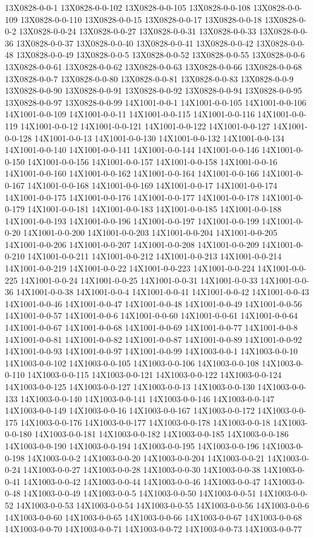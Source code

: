 \documentclass[
]{book}
\begin{document}
13X0828-0-0-1 13X0828-0-0-102 13X0828-0-0-105 13X0828-0-0-108 13X0828-0-0-109 13X0828-0-0-110 13X0828-0-0-15 13X0828-0-0-17 13X0828-0-0-18 13X0828-0-0-2 13X0828-0-0-24 13X0828-0-0-27 13X0828-0-0-31 13X0828-0-0-33 13X0828-0-0-36 13X0828-0-0-37 13X0828-0-0-40 13X0828-0-0-41 13X0828-0-0-42 13X0828-0-0-48 13X0828-0-0-49 13X0828-0-0-5 13X0828-0-0-52 13X0828-0-0-55 13X0828-0-0-6 13X0828-0-0-61 13X0828-0-0-62 13X0828-0-0-63 13X0828-0-0-66 13X0828-0-0-68 13X0828-0-0-7 13X0828-0-0-80 13X0828-0-0-81 13X0828-0-0-83 13X0828-0-0-9 13X0828-0-0-90 13X0828-0-0-91 13X0828-0-0-92 13X0828-0-0-94 13X0828-0-0-95 13X0828-0-0-97 13X0828-0-0-99 14X1001-0-0-1 14X1001-0-0-105 14X1001-0-0-106 14X1001-0-0-109 14X1001-0-0-11 14X1001-0-0-115 14X1001-0-0-116 14X1001-0-0-119 14X1001-0-0-12 14X1001-0-0-121 14X1001-0-0-122 14X1001-0-0-127 14X1001-0-0-128 14X1001-0-0-13 14X1001-0-0-130 14X1001-0-0-132 14X1001-0-0-134 14X1001-0-0-140 14X1001-0-0-141 14X1001-0-0-144 14X1001-0-0-146 14X1001-0-0-150 14X1001-0-0-156 14X1001-0-0-157 14X1001-0-0-158 14X1001-0-0-16 14X1001-0-0-160 14X1001-0-0-162 14X1001-0-0-164 14X1001-0-0-166 14X1001-0-0-167 14X1001-0-0-168 14X1001-0-0-169 14X1001-0-0-17 14X1001-0-0-174 14X1001-0-0-175 14X1001-0-0-176 14X1001-0-0-177 14X1001-0-0-178 14X1001-0-0-179 14X1001-0-0-181 14X1001-0-0-183 14X1001-0-0-185 14X1001-0-0-188 14X1001-0-0-193 14X1001-0-0-196 14X1001-0-0-197 14X1001-0-0-199 14X1001-0-0-20 14X1001-0-0-200 14X1001-0-0-203 14X1001-0-0-204 14X1001-0-0-205 14X1001-0-0-206 14X1001-0-0-207 14X1001-0-0-208 14X1001-0-0-209 14X1001-0-0-210 14X1001-0-0-211 14X1001-0-0-212 14X1001-0-0-213 14X1001-0-0-214 14X1001-0-0-219 14X1001-0-0-22 14X1001-0-0-223 14X1001-0-0-224 14X1001-0-0-225 14X1001-0-0-24 14X1001-0-0-25 14X1001-0-0-31 14X1001-0-0-33 14X1001-0-0-36 14X1001-0-0-38 14X1001-0-0-4 14X1001-0-0-41 14X1001-0-0-42 14X1001-0-0-43 14X1001-0-0-46 14X1001-0-0-47 14X1001-0-0-48 14X1001-0-0-49 14X1001-0-0-56 14X1001-0-0-57 14X1001-0-0-6 14X1001-0-0-60 14X1001-0-0-61 14X1001-0-0-64 14X1001-0-0-67 14X1001-0-0-68 14X1001-0-0-69 14X1001-0-0-77 14X1001-0-0-8 14X1001-0-0-81 14X1001-0-0-82 14X1001-0-0-87 14X1001-0-0-89 14X1001-0-0-92 14X1001-0-0-93 14X1001-0-0-97 14X1001-0-0-99 14X1003-0-0-1 14X1003-0-0-10 14X1003-0-0-102 14X1003-0-0-105 14X1003-0-0-106 14X1003-0-0-108 14X1003-0-0-110 14X1003-0-0-115 14X1003-0-0-121 14X1003-0-0-122 14X1003-0-0-124 14X1003-0-0-125 14X1003-0-0-127 14X1003-0-0-13 14X1003-0-0-130 14X1003-0-0-133 14X1003-0-0-140 14X1003-0-0-141 14X1003-0-0-146 14X1003-0-0-147 14X1003-0-0-149 14X1003-0-0-16 14X1003-0-0-167 14X1003-0-0-172 14X1003-0-0-175 14X1003-0-0-176 14X1003-0-0-177 14X1003-0-0-178 14X1003-0-0-18 14X1003-0-0-180 14X1003-0-0-181 14X1003-0-0-182 14X1003-0-0-185 14X1003-0-0-186 14X1003-0-0-190 14X1003-0-0-194 14X1003-0-0-195 14X1003-0-0-196 14X1003-0-0-198 14X1003-0-0-2 14X1003-0-0-20 14X1003-0-0-204 14X1003-0-0-21 14X1003-0-0-24 14X1003-0-0-27 14X1003-0-0-28 14X1003-0-0-30 14X1003-0-0-38 14X1003-0-0-41 14X1003-0-0-42 14X1003-0-0-44 14X1003-0-0-46 14X1003-0-0-47 14X1003-0-0-48 14X1003-0-0-49 14X1003-0-0-5 14X1003-0-0-50 14X1003-0-0-51 14X1003-0-0-52 14X1003-0-0-53 14X1003-0-0-54 14X1003-0-0-55 14X1003-0-0-56 14X1003-0-0-6 14X1003-0-0-60 14X1003-0-0-65 14X1003-0-0-66 14X1003-0-0-67 14X1003-0-0-68 14X1003-0-0-70 14X1003-0-0-71 14X1003-0-0-72 14X1003-0-0-73 14X1003-0-0-77 
\end{document}
